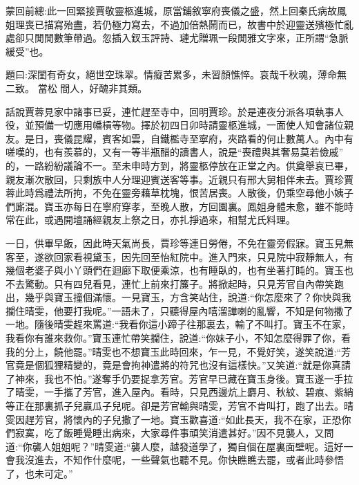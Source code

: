 

\begin{parag}
    \begin{note}蒙回前總:此一回緊接賈敬靈柩進城，原當鋪敘寧府喪儀之盛，然上回秦氏病故鳳姐理喪已描寫殆盡，若仍極力寫去，不過加倍熱鬧而已，故書中於迎靈送殯極忙亂處卻只閒閒數筆帶過。忽插入釵玉評詩、璉尤贈珮一段閒雅文字來，正所謂“急脈緩受”也。\end{note}
\end{parag}


\begin{parag}
    \begin{note}題曰:深閨有奇女，絕世空珠翠。情癡苦累多，未習顏憔悴。哀哉千秋魂，薄命無二致。 當松 間人，好醜非其類。\end{note}
\end{parag}



\begin{parag}
    話說賈蓉見家中諸事已妥，連忙趕至寺中，回明賈珍。於是連夜分派各項執事人役，並預備一切應用幡槓等物。擇於初四日卯時請靈柩進城，一面使人知會諸位親友。是日，喪儀昆耀，賓客如雲，自鐵檻寺至寧府，夾路看的何止數萬人。內中有嗟嘆的，也有羨慕的，又有一等半瓶醋的讀書人，說是“喪禮與其奢易莫若儉戚” 的，一路紛紛議論不一。至未申時方到，將靈柩停放在正堂之內。供奠舉哀已畢，親友漸次散回，只剩族中人分理迎賓送客等事。近親只有邢大舅相伴未去。賈珍賈蓉此時爲禮法所拘，不免在靈旁藉草枕塊，恨苦居喪。人散後，仍乘空尋他小姨子們廝混。寶玉亦每日在寧府穿孝，至晚人散，方回園裏。鳳姐身體未愈，雖不能時常在此，或遇開壇誦經親友上祭之日，亦扎掙過來，相幫尤氏料理。
\end{parag}


\begin{parag}
    一日，供畢早飯，因此時天氣尚長，賈珍等連日勞倦，不免在靈旁假寐。寶玉見無客至，遂欲回家看視黛玉，因先回至怡紅院中。進入門來，只見院中寂靜無人，有幾個老婆子與小丫頭們在迴廊下取便乘涼，也有睡臥的，也有坐著打盹的。寶玉也不去驚動。只有四兒看見，連忙上前來打簾子。將掀起時，只見芳官自內帶笑跑出，幾乎與寶玉撞個滿懷。一見寶玉，方含笑站住，說道:“你怎麼來了？你快與我攔住晴雯，他要打我呢。”一語未了，只聽得屋內嘻溜譁喇的亂響，不知是何物撒了一地。隨後晴雯趕來罵道:“我看你這小蹄子往那裏去，輸了不叫打。寶玉不在家，我看你有誰來救你。”寶玉連忙帶笑攔住，說道:“你妹子小，不知怎麼得罪了你，看我的分上，饒他罷。”晴雯也不想寶玉此時回來，乍一見，不覺好笑，遂笑說道:“芳官竟是個狐狸精變的，竟是會拘神遣將的符咒也沒有這樣快。”又笑道:“就是你真請了神來，我也不怕。”遂奪手仍要捉拿芳官。芳官早已藏在寶玉身後。寶玉遂一手拉了晴雯，一手攜了芳官，進入屋內。看時，只見西邊炕上麝月、秋紋、碧痕、紫綃等正在那裏抓子兒贏瓜子兒呢。卻是芳官輸與晴雯，芳官不肯叫打，跑了出去。晴雯因趕芳官，將懷內的子兒撒了一地。寶玉歡喜道:“如此長天，我不在家，正恐你們寂寞，吃了飯睡覺睡出病來，大家尋件事頑笑消遣甚好。”因不見襲人，又問道:“你襲人姐姐呢？”晴雯道:“襲人麼，越發道學了，獨自個在屋裏面壁呢。這好一會我沒進去，不知作什麼呢，一些聲氣也聽不見。你快瞧瞧去罷，或者此時參悟了，也未可定。”
\end{parag}


